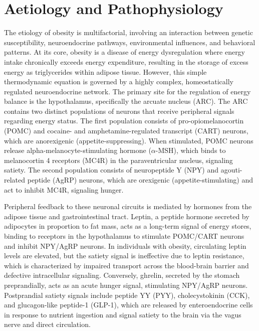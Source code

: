 \section*{Aetiology and Pathophysiology}
The etiology of obesity is multifactorial, involving an interaction between genetic susceptibility, neuroendocrine pathways, environmental influences, and behavioral patterns. At its core, obesity is a disease of energy dysregulation where energy intake chronically exceeds energy expenditure, resulting in the storage of excess energy as triglycerides within adipose tissue. However, this simple thermodynamic equation is governed by a highly complex, homeostatically regulated neuroendocrine network. The primary site for the regulation of energy balance is the hypothalamus, specifically the arcuate nucleus (ARC). The ARC contains two distinct populations of neurons that receive peripheral signals regarding energy status. The first population consists of pro-opiomelanocortin (POMC) and cocaine- and amphetamine-regulated transcript (CART) neurons, which are anorexigenic (appetite-suppressing). When stimulated, POMC neurons release alpha-melanocyte-stimulating hormone ($\alpha$-MSH), which binds to melanocortin 4 receptors (MC4R) in the paraventricular nucleus, signaling satiety. The second population consists of neuropeptide Y (NPY) and agouti-related peptide (AgRP) neurons, which are orexigenic (appetite-stimulating) and act to inhibit MC4R, signaling hunger.

Peripheral feedback to these neuronal circuits is mediated by hormones from the adipose tissue and gastrointestinal tract. Leptin, a peptide hormone secreted by adipocytes in proportion to fat mass, acts as a long-term signal of energy stores, binding to receptors in the hypothalamus to stimulate POMC/CART neurons and inhibit NPY/AgRP neurons. In individuals with obesity, circulating leptin levels are elevated, but the satiety signal is ineffective due to leptin resistance, which is characterized by impaired transport across the blood-brain barrier and defective intracellular signaling. Conversely, ghrelin, secreted by the stomach preprandially, acts as an acute hunger signal, stimulating NPY/AgRP neurons. Postprandial satiety signals include peptide YY (PYY), cholecystokinin (CCK), and glucagon-like peptide-1 (GLP-1), which are released by enteroendocrine cells in response to nutrient ingestion and signal satiety to the brain via the vagus nerve and direct circulation.

